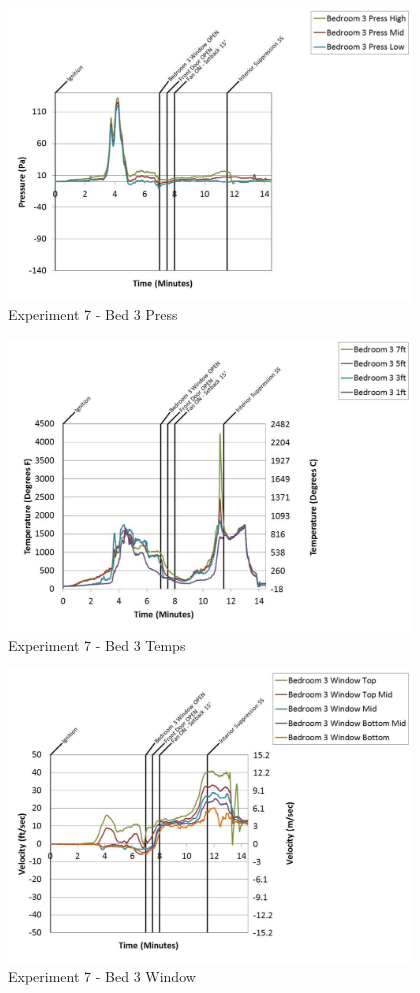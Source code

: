 \documentclass{article}
\begin{document}
\begin{appendices}
	\begin{figure}[h!]
		\centering
		\includegraphics[height=3.05in]{0_Images/Results_Charts/Exp_7_Charts/Bed3Press.pdf}
		\caption{Experiment 7 - Bed 3 Press}
	\end{figure}
 
	\clearpage

	\begin{figure}[h!]
		\centering
		\includegraphics[height=3.05in]{0_Images/Results_Charts/Exp_7_Charts/Bed3Temps.pdf}
		\caption{Experiment 7 - Bed 3 Temps}
	\end{figure}
 

	\begin{figure}[h!]
		\centering
		\includegraphics[height=3.05in]{0_Images/Results_Charts/Exp_7_Charts/Bed3Window.pdf}
		\caption{Experiment 7 - Bed 3 Window}
	\end{figure}
 

\end{appendices}
\end{document}
